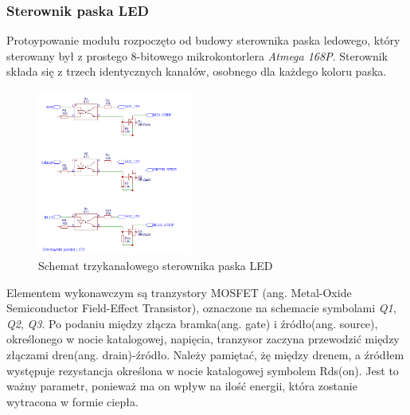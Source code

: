 \documentclass[12pt, eng, twoside, openany, final]{mgr}
\begin{document}
            \subsubsection{Sterownik paska LED}
                Protoypowanie modułu rozpoczęto od budowy sterownika paska ledowego, który sterowany był z prostego 8-bitowego mikrokontorlera \emph{Atmega 168P}. 
                Sterownik składa się z trzech identycznych kanałów, osobnego dla każdego koloru paska. 
                \begin{figure}[H]
                \begin{center}
                    \includegraphics[width=0.45\textwidth]{sterownik.png}
                    \caption{Schemat trzykanałowego sterownika paska LED}
                \end{center}
                \end{figure}
                Elementem wykonawczym są tranzystory MOSFET (ang. Metal-Oxide Semiconductor Field-Effect Transistor), oznaczone na schemacie symbolami \emph{Q1}, \emph{Q2}, \emph{Q3}. Po podaniu między złącza bramka(ang. gate) i źródło(ang. source), określonego w nocie katalogowej, napięcia, tranzysor zaczyna przewodzić między złączami dren(ang. drain)-źródło. Należy pamiętać, żę między drenem, a źródłem występuje rezystancja określona w nocie katalogowej symbolem Rds(on). Jest to ważny parametr, ponieważ ma on wpływ na ilość energii, która zostanie wytracona w formie ciepła. 
        
\end{document}
